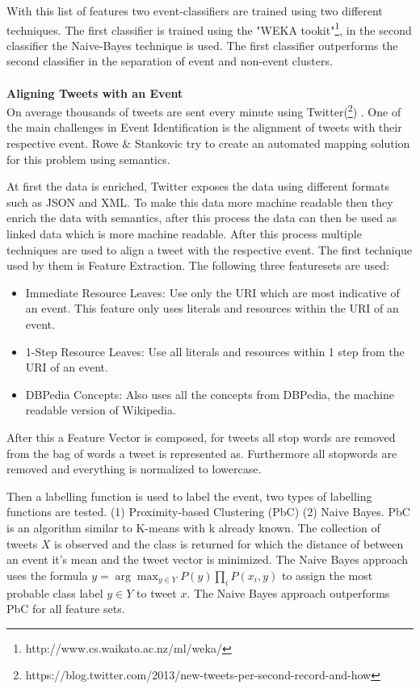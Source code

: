 \documentclass{article}
\begin{document}
With this list of features two event-classifiers are trained using two different techniques. The first classifier is trained using the "WEKA tookit"\footnote{http://www.cs.waikato.ac.nz/ml/weka/}, in the second classifier the  Naive-Bayes technique is used. The first classifier outperforms the second classifier in the separation of event and non-event clusters. \cite{eventident}
\\\\
\textbf{Aligning Tweets with an Event} \\

On average thousands of tweets are sent every minute using Twitter(\footnote{https://blog.twitter.com/2013/new-tweets-per-second-record-and-how}) . One of the main challenges in Event Identification is the alignment of tweets with their respective event. Rowe \& Stankovic try to create an automated mapping solution for this problem using semantics. \cite{eventalign}


At first the data is enriched, Twitter exposes the data using different formats such as JSON and XML. To make this data more machine readable then they enrich the data with semantics, after this process the data can then  be used as linked data which is more machine readable. After this process multiple techniques are used to align a tweet with the respective event. The first technique used by them is Feature Extraction. \cite{eventalign} The following three featuresets are used:
\begin{itemize}

  \item Immediate Resource Leaves: Use only the URI which are most indicative of an event. This feature only uses literals and resources within the URI of an event. 
  \item 1-Step Resource Leaves: Use all literals and resources within 1 step from the URI of an event. 
  \item DBPedia Concepts: Also uses all the concepts from DBPedia, the machine readable version of Wikipedia.
\end{itemize}
After this a Feature Vector is composed, for tweets all stop words are removed from the bag of words a tweet is represented as. Furthermore all stopwords are removed and everything is normalized to lowercase. \cite{eventalign} 

Then a labelling function is used to label the event, two types of labelling functions are tested. (1) Proximity-based Clustering (PbC) (2) Naive Bayes. PbC is an algorithm similar to K-means with k already known. The collection of tweets $X$ is observed and the class is returned for which the distance of between an event it's mean and the tweet vector is minimized. The Naive Bayes approach uses the formula $y = \arg\max_{y \in Y} P(y)\prod_i P(x_i, y)$ to assign the most probable class label $y \in Y$ to tweet $x$. The Naive Bayes approach outperforms PbC for all feature sets.  \cite{eventalign}
\end{document}
